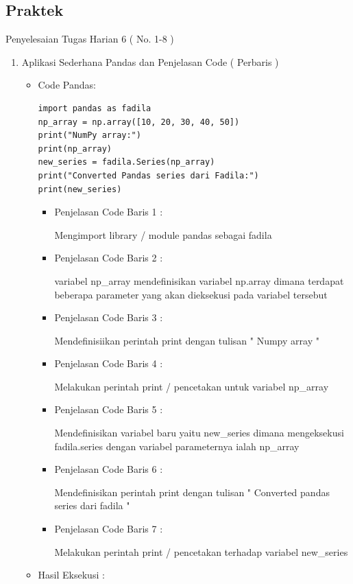 \subsection{Praktek}
Penyelesaian Tugas Harian 6 ( No. 1-8 )
\begin{enumerate}
\item Aplikasi Sederhana Pandas dan Penjelasan Code ( Perbaris )
\begin{itemize}
\item Code Pandas:
\begin{lstlisting}
import pandas as fadila
np_array = np.array([10, 20, 30, 40, 50])
print("NumPy array:")
print(np_array)
new_series = fadila.Series(np_array)
print("Converted Pandas series dari Fadila:")
print(new_series)
\end{lstlisting}
\par 
\par
\begin{itemize}
\item Penjelasan Code Baris 1 : 
\par Mengimport library / module pandas sebagai fadila
\item Penjelasan Code Baris 2 :
\par variabel np\_array mendefinisikan variabel np.array dimana terdapat beberapa parameter yang akan dieksekusi pada variabel tersebut
\item Penjelasan Code Baris 3 :
\par Mendefinisiikan perintah print dengan tulisan " Numpy array "
\item Penjelasan Code Baris 4 :
\par Melakukan perintah print / pencetakan untuk variabel np\_array
\item Penjelasan Code Baris 5 :
\par Mendefinisikan variabel baru yaitu new\_series dimana mengeksekusi fadila.series dengan variabel parameternya ialah np\_array
\item Penjelasan Code Baris 6 :
\par Mendefinisikan perintah print dengan tulisan " Converted pandas series dari fadila "
\item Penjelasan Code Baris 7 :
\par Melakukan perintah print / pencetakan terhadap variabel new\_series
\end{itemize}
\item Hasil Eksekusi :
\par
\par
\begin{figure}[ht]

\end{figure}
\end{itemize}
\end{enumerate}
